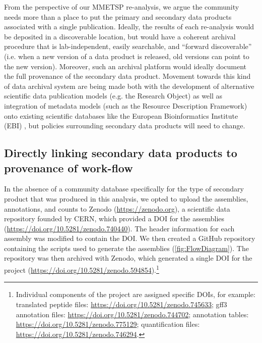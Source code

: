 \documentclass[a4paper,num-refs]{oup-contemporary}
\begin{document}
From the perspective of our MMETSP re-analysis, we argue the community needs more than a place to put the primary and secondary data products associated with a single publication. Ideally, the results of each re-analysis would be deposited in a discoverable location, but would have a coherent archival procedure that is lab-independent, easily searchable, and ``forward discoverable'' (i.e. when a  new version of a data product is released, old versions can point to the new version). Moreover, such an archival platform would ideally document the full provenance of the secondary data product. Movement towards this kind of data archival system are being made both with the development of alternative scientific data publication models (e.g. the Research Object\cite{Bechhofer2013}) as well as integration of metadata models (such as the Resource Description Framework) onto existing scientific databases like the European Bioinformatics Institute (EBI) \cite{Callahan2013}, but policies surrounding secondary data products will need to change.

\subsection{Directly linking secondary data products to provenance of work-flow}


In the absence of a community database specifically for the type of
secondary product that was produced in this analysis, we opted to
upload the assemblies, annotations, and counts to Zenodo
(\href{https://zenodo.org}{https://zenodo.org}), a scientific data repository founded by CERN,
which provided a DOI for the assemblies (\href{https://doi.org/10.5281/zenodo.740440}{https://doi.org/10.5281/zenodo.740440}).
The header information for each assembly was modified to contain the DOI. We then created a GitHub
repository containing the scripts used to generate the assemblies (\ref{fig:FlowDiagram}).
The repository was then archived with Zenodo,
which generated a single DOI for the project
(\href{https://doi.org/10.5281/zenodo.594854}{https://doi.org/10.5281/zenodo.594854}).\footnote{Individual components of the project are assigned specific DOIs, for example: translated peptide files: \href{https://doi.org/10.5281/zenodo.745633}{https://doi.org/10.5281/zenodo.745633};
gff3 annotation files: \href{https://doi.org/10.5281/zenodo.744702}{https://doi.org/10.5281/zenodo.744702};
annotation tables: \href{https://doi.org/10.5281/zenodo.775129}{https://doi.org/10.5281/zenodo.775129};
quantification files: \href{https://doi.org/10.5281/zenodo.746294}{https://doi.org/10.5281/zenodo.746294}.}
\end{document}
